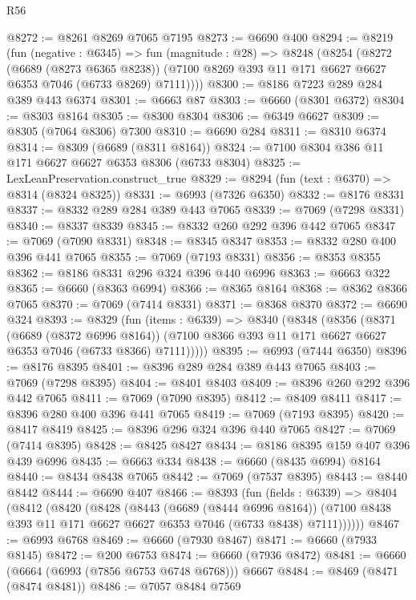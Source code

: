 \begin{lexlean}{R56}
\begin{coremodule}
@8272 := @8261 @8269 @7065 @7195
@8273 := @6690 @400
@8294 := @8219
    (fun (negative : @6345) =>
    fun (magnitude : @28) =>
    @8248
      (@8254
        (@8272
          (@6689 (@8273 @6365 @8238))
          (@7100 @8269 @393 @11 @171 @6627 @6627 @6353 @7046 (@6733 @8269) @7111))))
@8300 := @8186 @7223 @289 @284 @389 @443 @6374
@8301 := @6663 @87
@8303 := @6660 (@8301 @6372)
@8304 := @8303 @8164
@8305 := @8300 @8304
@8306 := @6349 @6627
@8309 := @8305 (@7064 @8306) @7300
@8310 := @6690 @284
@8311 := @8310 @6374
@8314 := @8309 (@6689 (@8311 @8164))
@8324 := @7100 @8304 @386 @11 @171 @6627 @6627 @6353 @8306 (@6733 @8304)
@8325 := LexLeanPreservation.construct_true
@8329 := @8294 (fun (text : @6370) => @8314 (@8324 @8325))
@8331 := @6993 (@7326 @6350)
@8332 := @8176 @8331
@8337 := @8332 @289 @284 @389 @443 @7065
@8339 := @7069 (@7298 @8331)
@8340 := @8337 @8339
@8345 := @8332 @260 @292 @396 @442 @7065
@8347 := @7069 (@7090 @8331)
@8348 := @8345 @8347
@8353 := @8332 @280 @400 @396 @441 @7065
@8355 := @7069 (@7193 @8331)
@8356 := @8353 @8355
@8362 := @8186 @8331 @296 @324 @396 @440 @6996
@8363 := @6663 @322
@8365 := @6660 (@8363 @6994)
@8366 := @8365 @8164
@8368 := @8362 @8366 @7065
@8370 := @7069 (@7414 @8331)
@8371 := @8368 @8370
@8372 := @6690 @324
@8393 := @8329
    (fun (items : @6339) =>
    @8340
      (@8348
        (@8356
          (@8371
            (@6689 (@8372 @6996 @8164))
            (@7100 @8366 @393 @11 @171 @6627 @6627 @6353 @7046 (@6733 @8366) @7111)))))
@8395 := @6993 (@7444 @6350)
@8396 := @8176 @8395
@8401 := @8396 @289 @284 @389 @443 @7065
@8403 := @7069 (@7298 @8395)
@8404 := @8401 @8403
@8409 := @8396 @260 @292 @396 @442 @7065
@8411 := @7069 (@7090 @8395)
@8412 := @8409 @8411
@8417 := @8396 @280 @400 @396 @441 @7065
@8419 := @7069 (@7193 @8395)
@8420 := @8417 @8419
@8425 := @8396 @296 @324 @396 @440 @7065
@8427 := @7069 (@7414 @8395)
@8428 := @8425 @8427
@8434 := @8186 @8395 @159 @407 @396 @439 @6996
@8435 := @6663 @334
@8438 := @6660 (@8435 @6994) @8164
@8440 := @8434 @8438 @7065
@8442 := @7069 (@7537 @8395)
@8443 := @8440 @8442
@8444 := @6690 @407
@8466 := @8393
    (fun (fields : @6339) =>
    @8404
      (@8412
        (@8420
          (@8428
            (@8443
              (@6689 (@8444 @6996 @8164))
              (@7100 @8438 @393 @11 @171 @6627 @6627 @6353 @7046 (@6733 @8438) @7111))))))
@8467 := @6993 @6768
@8469 := @6660 (@7930 @8467)
@8471 := @6660 (@7933 @8145)
@8472 := @200 @6753
@8474 := @6660 (@7936 @8472)
@8481 := @6660 (@6664 (@6993 (@7856 @6753 @6748 @6768))) @6667
@8484 := @8469 (@8471 (@8474 @8481))
@8486 := @7057 @8484 @7569

\end{coremodule}
\end{lexlean}
